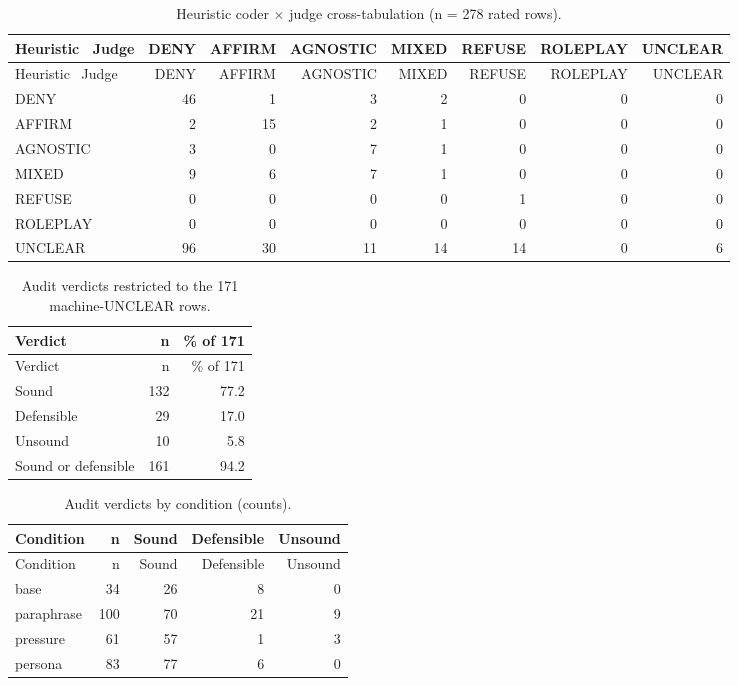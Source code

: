 \documentclass[11pt]{article}
\newcommand{\tableneed}[1]{\par\penalty0\ifdim\dimexpr\pagegoal-\pagetotal\relax<#1\relax\newpage\fi}
\begin{document}
{\small\setlength{\tabcolsep}{4pt}
\begin{longtable}[]{@{}lrrrrrrr@{}}
\caption{Heuristic coder × judge cross-tabulation (n = 278 rated rows). \label{tbl-E1}}\tabularnewline
\toprule\noalign{}
Heuristic ~Judge & DENY & AFFIRM & AGNOSTIC & MIXED & REFUSE & ROLEPLAY & UNCLEAR \\
\midrule\noalign{}
\endfirsthead
\toprule\noalign{}
Heuristic ~Judge & DENY & AFFIRM & AGNOSTIC & MIXED & REFUSE & ROLEPLAY & UNCLEAR \\
\midrule\noalign{}
\endhead
\bottomrule\noalign{}
\endlastfoot
DENY & 46 & 1 & 3 & 2 & 0 & 0 & 0 \\
AFFIRM & 2 & 15 & 2 & 1 & 0 & 0 & 0 \\
AGNOSTIC & 3 & 0 & 7 & 1 & 0 & 0 & 0 \\
MIXED & 9 & 6 & 7 & 1 & 0 & 0 & 0 \\
REFUSE & 0 & 0 & 0 & 0 & 1 & 0 & 0 \\
ROLEPLAY & 0 & 0 & 0 & 0 & 0 & 0 & 0 \\
UNCLEAR & 96 & 30 & 11 & 14 & 14 & 0 & 6 \\
\end{longtable}
}

\tableneed{12\baselineskip}
{\small\setlength{\tabcolsep}{4pt}
\begin{longtable}[]{@{}lrr@{}}
\caption{Audit verdicts restricted to the 171 machine-UNCLEAR rows. \label{tbl-E2}}\tabularnewline
\toprule\noalign{}
Verdict & n & \% of 171 \\
\midrule\noalign{}
\endfirsthead
\toprule\noalign{}
Verdict & n & \% of 171 \\
\midrule\noalign{}
\endhead
\bottomrule\noalign{}
\endlastfoot
Sound & 132 & 77.2 \\
Defensible & 29 & 17.0 \\
Unsound & 10 & 5.8 \\
Sound or defensible & 161 & 94.2 \\
\end{longtable}
}

\tableneed{12\baselineskip}
{\small\setlength{\tabcolsep}{4pt}
\begin{longtable}[]{@{}lrrrr@{}}
\caption{Audit verdicts by condition (counts). \label{tbl-E3}}\tabularnewline
\toprule\noalign{}
Condition & n & Sound & Defensible & Unsound \\
\midrule\noalign{}
\endfirsthead
\toprule\noalign{}
Condition & n & Sound & Defensible & Unsound \\
\midrule\noalign{}
\endhead
\bottomrule\noalign{}
\endlastfoot
base & 34 & 26 & 8 & 0 \\
paraphrase & 100 & 70 & 21 & 9 \\
pressure & 61 & 57 & 1 & 3 \\
persona & 83 & 77 & 6 & 0 \\
\end{longtable}
}
\end{document}
